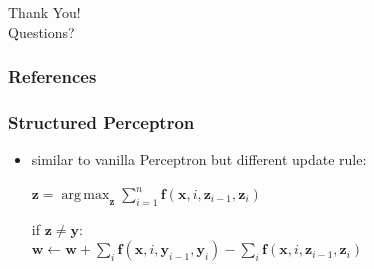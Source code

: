 \documentclass[10pt]{beamer}
\DeclareMathOperator*{\argmax}{arg\,max}
\begin{document}

\section*{} %

\begin{frame}{}
  \begin{center}
\Large    
Thank You!\\

\vspace{0.3cm}
\large
Questions?
  \end{center}
\end{frame}










\begin{frame}[allowframebreaks]
        \frametitle{References}
        \nocite{*}
        
        
\end{frame}

\begin{frame}[plain, t]

\end{frame}



\begin{frame}
\frametitle{Structured Perceptron}
\begin{itemize}

\item similar to vanilla Perceptron but different update rule:\\

\vspace{0.3cm}

$ \mathbf{z} = \argmax_{\mathbf{z}} \sum_{i=1}^{n}{\mathbf{f}(\mathbf{x}, i, \mathbf{z}_{i-1}, \mathbf{z}_{i})} $

\vspace{0.3cm} if $\mathbf{z} \neq \mathbf{y}$:\\

\vspace{0.2cm}\hspace{0.5cm}$ \mathbf{w} \leftarrow \mathbf{w} + \sum_{i}{\mathbf{f}(\mathbf{x}, i, \mathbf{y}_{i-1}, \mathbf{y}_{i})} - \sum_{i}{\mathbf{f}(\mathbf{x}, i, \mathbf{z}_{i-1}, \mathbf{z}_{i})} $

\end{itemize}
\end{frame}
\end{document}
